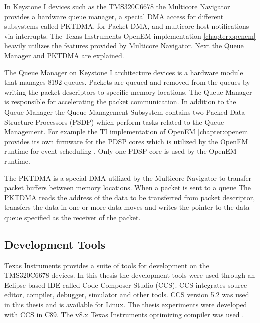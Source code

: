In Keystone I devices such as the TMS320C6678 the Multicore Navigator provides a hardware queue manager, a special DMA access for different subsystems called PKTDMA, for Packet DMA, and multicore host notifications via interrupts. \cite{navigator} The Texas Instruments OpenEM implementation \ref{chapter:openem} heavily utilizes the features provided by Multicore Navigator. Next the Queue Manager and PKTDMA are explained.

The Queue Manager on Keystone I architecture devices is a hardware module that manages 8192 queues. Packets are queued and removed from the queues by writing the packet descriptors to specific memory locations. The Queue Manager is responsible for accelerating the packet communication. In addition to the Queue Manager the Queue Management Subsystem contains two Packed Data Structure Processors (PSDP) which perform tasks related to the Queue Management. \cite{navigator} For example the TI implementation of OpenEM \ref{chapter:openem} provides its own firmware for the PDSP cores which is utilized by the OpenEM runtime for event scheduling \cite{openemwhite}. Only one PDSP core is used by the OpenEM runtime.

The PKTDMA is a special DMA utilized by the Multicore Navigator to transfer packet buffers between memory locations. When a packet is sent to a queue The PKTDMA reads the address of the data to be transferred from packet descriptor, transfers the data in one or more data moves and writes the pointer to the data queue specified as the receiver of the packet. \cite{navigator} 

\subsection{Development Tools}
\label{subsec:devtools}

Texas Instruments provides a suite of tools for development on the TMS320C6678 devices. In this thesis the development tools were used through an Eclipse based IDE called Code Composer Studio (CCS). CCS integrates source editor, compiler, debugger, simulator and other tools. CCS version 5.2 was used in this thesis and is available for Linux. \cite{ccspage} The thesis experiments were developed with CCS in C89. The v8.x Texas Instruments optimizing compiler was used \cite{compilerguide}.
